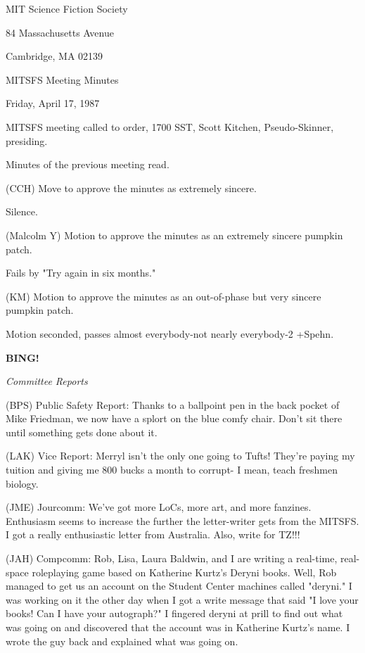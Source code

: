 \documentclass[12pt]{article}
\newcommand{\bing}{{\bf BING!} }
\newcommand{\goto}[1]{\bing \vskip 12pt \centerline{{\em{#1}}}}
\begin{document}
\begin{center}

MIT Science Fiction Society 

84 Massachusetts Avenue

Cambridge, MA 02139

\vspace{12pt}

MITSFS Meeting Minutes 

Friday, April 17, 1987

\end{center}
 
\vspace{18pt}

\setlength{\parskip}{6pt}

\noindent
MITSFS meeting called to order, 1700 SST,
Scott Kitchen, Pseudo-Skinner, presiding.

Minutes of the previous meeting read.

(CCH) Move to approve the minutes as extremely sincere.

Silence.

(Malcolm Y) Motion to approve the minutes as an extremely sincere pumpkin patch.

Fails by "Try again in six months."

(KM) Motion to approve the minutes as an out-of-phase but very sincere pumpkin patch.

Motion seconded, passes almost everybody-not nearly everybody-2 +Spehn.

\goto{Committee Reports}

(BPS) Public Safety Report: Thanks to a ballpoint pen in the back pocket of Mike Friedman, we now have a splort on the blue comfy chair. Don't sit there until something gets done about it.

(LAK) Vice Report: Merryl isn't the only one going to Tufts! They're paying my tuition and giving me 800 bucks a month to corrupt- I mean, teach freshmen biology.

(JME) Jourcomm: We've got more LoCs, more art, and more fanzines. Enthusiasm seems to increase the further the letter-writer gets from the MITSFS. I got a really enthusiastic letter from Australia. Also, write for TZ!!!

(JAH) Compcomm: Rob, Lisa, Laura Baldwin, and I are writing a real-time, real-space roleplaying game based on Katherine Kurtz's Deryni books. Well, Rob managed to get us an account on the Student Center machines called "deryni." I was working on it the other day when I got a write message that said "I love your books! Can I have your autograph?" I fingered deryni at prill to find out what was going on and discovered that the account was in Katherine Kurtz's name. I wrote the guy back and explained what was going on.
\end{document}

